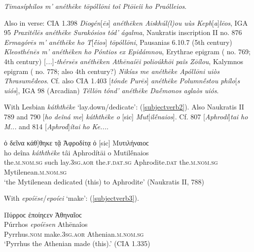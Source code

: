\citep[123ff.]{Kretschmer1891} \textit{Timasíphilos m' \emph{anéthēke} tōpóllōni toî Ptōieîi ho Praólleios}.

Also in verse: CIA 1.398 \textit{Diogén}{[}\textit{ēs}{]}\textit{ \emph{anéthēken} Aiskhúl(l)ou uùs Keph}{[}\textit{a}{]}\textit{lēos}, IGA 95 \textit{Praxitélēs \emph{anéthēke} Surakósios tód' ágalma}, Naukratis inscription II no. 876 \textit{Ermagórēs m' \emph{anéthēke} ho T}{[}\textit{ḗios}{]} \textit{tōpóllōni}, Pausanias 6.10.7 (5th century) \textit{Kleosthénēs m' \emph{anéthēken} ho Póntios ex Epidámnou}, Erythrae epigram (\citealp[312]{Kaibel1878} no. 769; 4th century) {[}\textit{...}{]}\textit{-thérsēs \emph{anéthēken} Athēnaíēi polioúkhōi paîs Zōílou}, Kalymnos epigram (\citealp[315]{Kaibel1878} no. 778; also 4th century?) \textit{Nikías me \emph{anéthēke} Apóllōni uiòs Thrasumḗdeos}. Cf. also CIA 1.403 {[}\textit{tónde Purēs}{]} \textit{\emph{anéthēke} Polumnḗstou phílo}{[}\textit{s uiós}{]}, IGA 98 (Arcadian) \textit{Téllōn tónd' \emph{anéthēke} Daḗmonos aglaòs uiós}.

With Lesbian \textit{káththēke} `lay.down/dedicate': (\ref{subjectverb2}). Also Naukratis II 789 and 790 {[}\textit{ho deîná me}{]} \textit{\emph{káththēke} o} {[}sic{]} \textit{Mut}{[}\textit{ilḗnaios}{]}. Cf. 807 {[}\textit{Aphrodí}{]}\textit{tai ho M...} and 814 {[}\textit{Aphrod}{]}\textit{ítai ho Ke...}.

\begin{exe}
\ex {[}ὁ δεῖνα κάθ{]}θηκε τᾷ Ἀφροδίτᾳ ὀ {[}sic{]} Μυτιλήναιοϲ\\
\gll ho deîna \emph{káththēke} tâi Aphrodítāi o Mutilḗnaios\\
the.\textsc{m.nom.sg} such lay.\textsc{3sg.aor} the.\textsc{f.dat.sg} Aphrodite.\textsc{dat} the.\textsc{m.nom.sg} Mytilenean.\textsc{m.nom.sg}\\
\trans `the Mytilenean dedicated (this) to Aphrodite' (Naukratis II, 788) 
\label{subjectverb2}
\end{exe}

With \textit{epoíēse}/\textit{epoíei} `make': (\ref{subjectverb3}).

\begin{exe}
\ex Πύρροϲ ἐποίηϲεν Ἀθηναῖοϲ\\
\gll Púrrhos \emph{epoíēsen} Athēnaîos\\
Pyrrhus.\textsc{nom} make.\textsc{3sg.aor} Athenian.\textsc{m.nom.sg}\\
\trans `Pyrrhus the Athenian made (this).' (CIA 1.335) 
\label{subjectverb3}
\end{exe}


